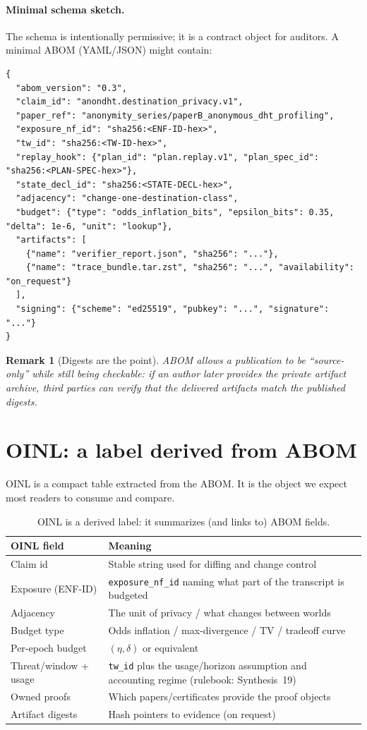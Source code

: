 \documentclass[11pt]{article}
\newtheorem{remark}{Remark}
\begin{document}
\paragraph{Minimal schema sketch.}
The schema is intentionally permissive; it is a contract object for auditors.
A minimal ABOM (YAML/JSON) might contain:
\begin{lstlisting}
{
  "abom_version": "0.3",
  "claim_id": "anondht.destination_privacy.v1",
  "paper_ref": "anonymity_series/paperB_anonymous_dht_profiling",
  "exposure_nf_id": "sha256:<ENF-ID-hex>",
  "tw_id": "sha256:<TW-ID-hex>",
  "replay_hook": {"plan_id": "plan.replay.v1", "plan_spec_id": "sha256:<PLAN-SPEC-hex>"},
  "state_decl_id": "sha256:<STATE-DECL-hex>",
  "adjacency": "change-one-destination-class",
  "budget": {"type": "odds_inflation_bits", "epsilon_bits": 0.35, "delta": 1e-6, "unit": "lookup"},
  "artifacts": [
    {"name": "verifier_report.json", "sha256": "..."},
    {"name": "trace_bundle.tar.zst", "sha256": "...", "availability": "on_request"}
  ],
  "signing": {"scheme": "ed25519", "pubkey": "...", "signature": "..."}
}
\end{lstlisting}

\begin{remark}[Digests are the point]
ABOM allows a publication to be ``source-only'' while still being checkable: if an author later provides the private artifact archive, third parties can verify that the delivered artifacts match the published digests.
\end{remark}

\section{OINL: a label derived from ABOM}
OINL is a compact table extracted from the ABOM.
It is the object we expect most readers to consume and compare.

\begin{table}[t]
\centering
\begin{tabular}{@{}ll@{}}
\toprule
\textbf{OINL field} & \textbf{Meaning}\\
\midrule
Claim id & Stable string used for diffing and change control \\
Exposure (ENF-ID) & \texttt{exposure\_nf\_id} naming what part of the transcript is budgeted \\
Adjacency & The unit of privacy / what changes between worlds \\
Budget type & Odds inflation / max-divergence / TV / tradeoff curve \\
Per-epoch budget & $(\eta,\delta)$ or equivalent \\
Threat/window + usage & \texttt{tw\_id} plus the usage/horizon assumption and accounting regime (rulebook: Synthesis~19) \\
Owned proofs & Which papers/certificates provide the proof objects \\
Artifact digests & Hash pointers to evidence (on request) \\
\bottomrule
\end{tabular}
\caption{OINL is a derived label: it summarizes (and links to) ABOM fields.}
\end{table}
\end{document}
